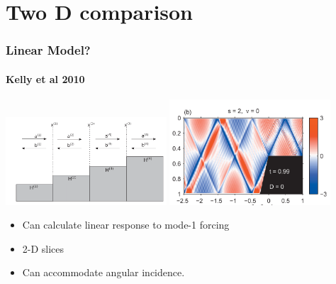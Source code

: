 \documentclass[aspectratio=169]{beamer}
\begin{document}
\section{Two D comparison}
\begin{frame}
  \frametitle{Linear Model?}
  \framesubtitle{Kelly et al 2010}
  \begin{center}
    \includegraphics[width=0.45\textwidth]{doc/kellyetal13ba.png}  
    \includegraphics[width=0.45\textwidth]{doc/kellyetal13ba2.png}  
  \end{center}
  \begin{itemize}
    \item Can calculate linear response to mode-1 forcing  
    \item 2-D slices
    \item Can accommodate angular incidence.
  \end{itemize}
\end{frame}
\end{document}
